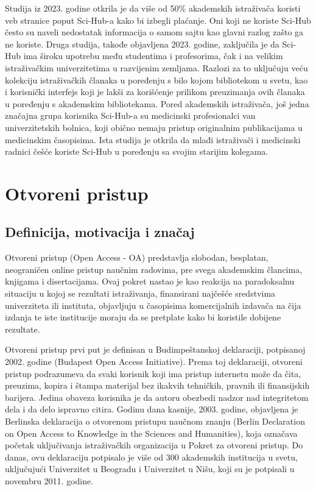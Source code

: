 \documentclass{article}
\begin{document}
Studija iz 2023. godine otkrila je da više od 50\% akademskih istraživača koristi veb stranice poput Sci-Hub-a kako bi izbegli plaćanje. Oni koji ne koriste Sci-Hub često su naveli nedostatak informacija o samom sajtu kao glavni razlog zašto ga ne koriste. Druga studija, takođe objavljena 2023. godine, zaključila je da Sci-Hub ima široku upotrebu među studentima i profesorima, čak i na velikim istraživačkim univerzitetima u razvijenim zemljama. Razlozi za to uključuju veću kolekciju istraživačkih članaka u poređenju s bilo kojom bibliotekom u svetu, kao i korisnički interfejs koji je lakši za korišćenje prilikom preuzimanja ovih članaka u poređenju s akademskim bibliotekama. Pored akademskih istraživača, još jedna značajna grupa korisnika Sci-Hub-a su medicinski profesionalci van univerzitetskih bolnica, koji obično nemaju pristup originalnim publikacijama u medicinskim časopisima. Ista studija je otkrila da mlađi istraživači i medicinski radnici češće koriste Sci-Hub u poređenju sa svojim starijim kolegama.


\section{Otvoreni pristup}

\subsection{Definicija, motivacija i značaj}

Otvoreni pristup (Open Access - OA) predstavlja slobodan, besplatan, neograničen online pristup naučnim radovima, pre svega akademskim člancima, knjigama i disertacijama. Ovaj pokret nastao je kao reakcija na paradoksalnu situaciju u kojoj se rezultati istraživanja, finansirani najčešće sredstvima univerziteta ili instituta, objavljuju u časopisima komercijalnih izdavača na čija izdanja te iste institucije moraju da se pretplate kako bi koristile dobijene rezultate.

Otvoreni pristup prvi put je definisan u Budimpeštanskoj deklaraciji, potpisanoj 2002. godine (Budapest Open Access Initiative). Prema toj deklaraciji, otvoreni pristup podrazumeva da svaki korisnik koji ima pristup internetu može da čita, preuzima, kopira i štampa materijal bez ikakvih tehničkih, pravnih ili finansijskih barijera. Jedina obaveza korisnika je da autoru obezbedi nadzor nad integritetom dela i da delo ispravno citira. Godinu dana kasnije, 2003. godine, objavljena je Berlinska deklaracija o otvorenom pristupu naučnom znanju (Berlin Declaration on Open Access to Knowledge in the Sciences and Humanities), koja označava početak uključivanja istraživačkih organizacija u Pokret za otvoreni pristup. Do danas, ovu deklaraciju potpisalo je više od 300 akademskih institucija u svetu, uključujući Univerzitet u Beogradu i Univerzitet u Nišu, koji su je potpisali u novembru 2011. godine.
\end{document}
